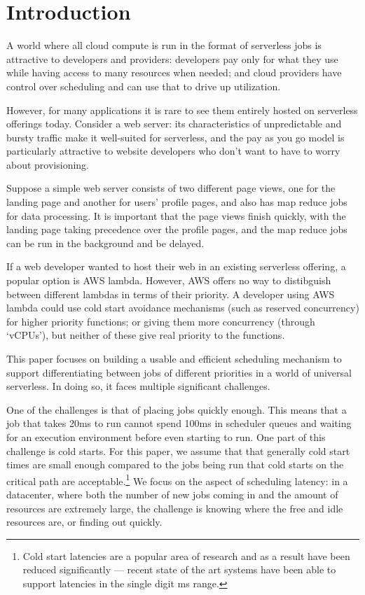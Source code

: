 \section{Introduction}

A world where all cloud compute is run in the format of serverless jobs is
attractive to developers and providers: developers pay only for what they use
while having access to many resources when needed; and cloud providers have
control over scheduling and can use that to drive up utilization.


However, for many applications it is rare to see them entirely hosted on
serverless offerings today\cite{TODO}. Consider a web server: its
characteristics of unpredictable and bursty traffic make it well-suited for
serverless, and the pay as you go model is particularly attractive to website
developers who don't want to have to worry about provisioning.

Suppose a simple web server consists of two different page views, one for the
landing page and another for users' profile pages, and also has map reduce jobs
for data processing. It is important that the page views finish quickly, with
the landing page taking precedence over the profile pages, and the map reduce
jobs can be run in the background and be delayed.

If a web developer wanted to host their web in an existing serverless offering,
a popular option is AWS lambda\cite{TODO}. However, AWS offers no way to
distibguish between different lambdas in terms of their priority. A developer
using AWS lambda could use cold start avoidance mechanisms (such as reserved
concurrency) for higher priority functions; or giving them more concurrency
(through `vCPUs'), but neither of these give real priority to the
functions.

This paper focuses on building a usable and efficient scheduling mechanism to
support differentiating between jobs of different priorities in a world of
universal serverless. In doing so, it faces multiple significant challenges.

One of the challenges is that of placing jobs quickly enough. This means that a
job that takes 20ms to run cannot spend 100ms in scheduler queues and waiting
for an execution environment before even starting to run. One part of this
challenge is cold starts. For this paper, we assume that that generally cold
start times are small enough compared to the jobs being run that cold starts on
the critical path are acceptable.\footnote{Cold start latencies are a popular
area of research and as a result have been reduced significantly --- recent
state of the art systems have been able to support latencies in the single digit
ms range\cite{TODO}.} We focus on the aspect of scheduling latency: in a
datacenter, where both the number of new jobs coming in and the amount of
resources are extremely large, the challenge is knowing where the free and idle
resources are, or finding out quickly.

